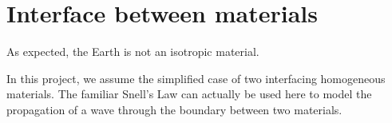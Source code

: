 


\section{Interface between materials}
As expected, the Earth is not an isotropic material.

In this project, we assume the simplified case of two interfacing homogeneous materials. The familiar Snell's Law can actually be used here to model the propagation of a wave through the boundary between two materials.

